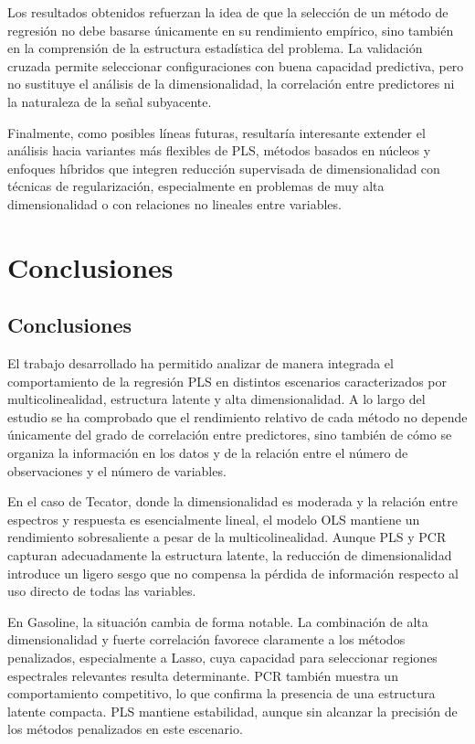 \documentclass[12pt,a4paper]{report}
\begin{document}
Los resultados obtenidos refuerzan la idea de que la selección de un método de regresión no debe basarse únicamente en su rendimiento empírico, sino también en la comprensión de la estructura estadística del problema. La validación cruzada permite seleccionar configuraciones con buena capacidad predictiva, pero no sustituye el análisis de la dimensionalidad, la correlación entre predictores ni la naturaleza de la señal subyacente.

Finalmente, como posibles líneas futuras, resultaría interesante extender el análisis hacia variantes más flexibles de PLS, métodos basados en núcleos y enfoques híbridos que integren reducción supervisada de dimensionalidad con técnicas de regularización, especialmente en problemas de muy alta dimensionalidad o con relaciones no lineales entre variables.


\chapter{Conclusiones}

\section{Conclusiones}

El trabajo desarrollado ha permitido analizar de manera integrada el comportamiento de la regresión PLS en distintos escenarios caracterizados por multicolinealidad, estructura latente y alta dimensionalidad. A lo largo del estudio se ha comprobado que el rendimiento relativo de cada método no depende únicamente del grado de correlación entre predictores, sino también de cómo se organiza la información en los datos y de la relación entre el número de observaciones y el número de variables.

En el caso de Tecator, donde la dimensionalidad es moderada y la relación entre espectros y respuesta es esencialmente lineal, el modelo OLS mantiene un rendimiento sobresaliente a pesar de la multicolinealidad. Aunque PLS y PCR capturan adecuadamente la estructura latente, la reducción de dimensionalidad introduce un ligero sesgo que no compensa la pérdida de información respecto al uso directo de todas las variables.

En Gasoline, la situación cambia de forma notable. La combinación de alta dimensionalidad y fuerte correlación favorece claramente a los métodos penalizados, especialmente a Lasso, cuya capacidad para seleccionar regiones espectrales relevantes resulta determinante. PCR también muestra un comportamiento competitivo, lo que confirma la presencia de una estructura latente compacta. PLS mantiene estabilidad, aunque sin alcanzar la precisión de los métodos penalizados en este escenario.
\end{document}
